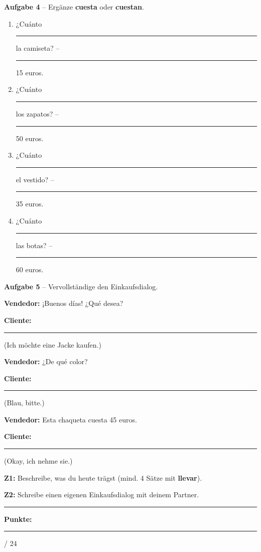 \documentclass[11pt, a4paper]{article}
\newcommand{\fachfarbe}{spanisch}
\newcommand{\maxpunkte}{24}
\newcommand{\punktebox}[1]{\hfill\fbox{\small \_/#1}}
\newcommand{\luecke}[1]{\rule{#1}{0.4pt}}
\newcommand{\es}[1]{\textcolor{\fachfarbe}{\textbf{#1}}}
\begin{document}
\vspace{8pt}


\textbf{\textcolor{\fachfarbe}{Aufgabe 4}} -- Ergänze \es{cuesta} oder \es{cuestan}. \punktebox{4}

\vspace{3pt}

\begin{enumerate}[label=\alph*), nosep, itemsep=4pt]
    \item ¿Cuánto \luecke{2cm} la camiseta? -- \luecke{2cm} 15 euros.
    \item ¿Cuánto \luecke{2cm} los zapatos? -- \luecke{2cm} 50 euros.
    \item ¿Cuánto \luecke{2cm} el vestido? -- \luecke{2cm} 35 euros.
    \item ¿Cuánto \luecke{2cm} las botas? -- \luecke{2cm} 60 euros.
\end{enumerate}

\vspace{8pt}


\textbf{\textcolor{\fachfarbe}{Aufgabe 5}} -- Vervollständige den Einkaufsdialog. \punktebox{4}

\vspace{3pt}

\noindent
\textbf{Vendedor:} ¡Buenos días! ¿Qué desea?

\textbf{Cliente:} \luecke{10cm} (Ich möchte eine Jacke kaufen.)

\textbf{Vendedor:} ¿De qué color?

\textbf{Cliente:} \luecke{10cm} (Blau, bitte.)

\textbf{Vendedor:} Esta chaqueta cuesta 45 euros.

\textbf{Cliente:} \luecke{10cm} (Okay, ich nehme sie.)

\vspace{10pt}


\begin{tcolorbox}[colback=white, colframe=spanisch, boxrule=1pt, arc=0pt, title=\textbf{Zusatzaufgaben für Schnelle}]
\small
\textbf{Z1:} Beschreibe, was du heute trägst (mind. 4 Sätze mit \es{llevar}).

\vspace{0.5em}

\textbf{Z2:} Schreibe einen eigenen Einkaufsdialog mit deinem Partner.
\end{tcolorbox}

\vspace{8pt}

\hrule
\vspace{5pt}

\begin{flushright}
\textbf{Punkte:} \luecke{1cm} / \maxpunkte
\end{flushright}
\end{document}
